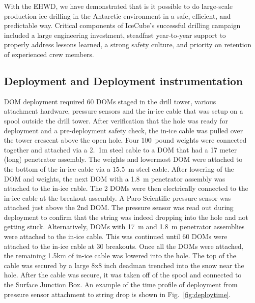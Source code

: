 
With the EHWD, we have demonstrated that is it possible to do large-scale production ice drilling in the Antarctic environment in a safe, efficient, and predictable way.  Critical components of IceCube’s successful drilling campaign included a large engineering investment, steadfast year-to-year support to properly address lessons learned, a strong safety culture, and priority on retention of experienced crew members.

\subsection{\label{sec:deployment_inst}Deployment and Deployment instrumentation}

DOM deployment required 60 DOMs staged in the drill tower, various attachment hardware, pressure sensors and the in-ice cable that was setup on a spool outside the drill tower. After verification that the hole was ready for deployment and a pre-deployment safety check, the in-ice cable was pulled over the tower crescent above the open hole. Four 100~pound weights were connected together and attached via a 2.~1m steel cable to a DOM that had a 17 meter (long) penetrator assembly. The weights and lowermost DOM were attached to the bottom of the in-ice cable via a 15.5~m steel cable. After lowering of the DOM and weights, the next DOM with a 1.8~m penetrator assembly was attached to the in-ice cable. The 2 DOMs were then electrically connected to the in-ice cable at the breakout assembly. A Paro Scientific pressure sensor was attached just above the 2nd DOM. The pressure sensor was read out during deployment to confirm that the string was indeed dropping into the hole and not getting stuck. Alternatively, DOMs with 17~m and 1.8~m penetrator assemblies were attached to the in-ice cable. This was continued until 60 DOMs were attached to the in-ice cable at 30 breakouts. Once all the DOMs were attached, the remaining 1.5km of in-ice cable was lowered into the hole. The top of the cable was secured by a large 8x8 inch deadman trenched into the snow near the hole. After the cable was secure, it was taken off of the spool and connected to the Surface Junction Box. An example of the time profile of deployment from pressure sensor attachment to string drop is shown in Fig.~\ref{fig:deploytime}.

